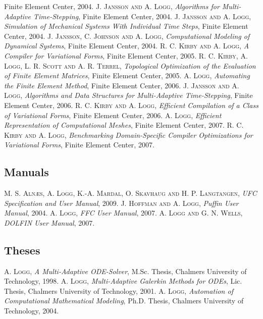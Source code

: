 \begin{thebibliography}{99}
{Finite Element Center,
2004.
}
 {\textsc{J. Jansson and A. Logg},
\textit{Algorithms for Multi-Adaptive Time-Stepping},
Finite Element Center,
2004.
}
 {\textsc{J. Jansson and A. Logg},
\textit{Simulation of Mechanical Systems With Individual Time Steps},
Finite Element Center,
2004.
}
 {\textsc{J. Jansson, C. Johnson and A. Logg},
\textit{Computational Modeling of Dynamical Systems},
Finite Element Center,
2004.
}
 {\textsc{R. C. Kirby and A. Logg},
\textit{A Compiler for Variational Forms},
Finite Element Center,
2005.
}
 {\textsc{R. C. Kirby, A. Logg, L. R. Scott and A. R. Terrel},
\textit{Topological Optimization of the Evaluation of Finite Element Matrices},
Finite Element Center,
2005.
}
 {\textsc{A. Logg},
\textit{Automating the Finite Element Method},
Finite Element Center,
2006.
}
 {\textsc{J. Jansson and A. Logg},
\textit{Algorithms and Data Structures for Multi-Adaptive Time-Stepping},
Finite Element Center,
2006.
}
 {\textsc{R. C. Kirby and A. Logg},
\textit{Efficient Compilation of a Class of Variational Forms},
Finite Element Center,
2006.
}
 {\textsc{A. Logg},
\textit{Efficient Representation of Computational Meshes},
Finite Element Center,
2007.
}
 {\textsc{R. C. Kirby and A. Logg},
\textit{Benchmarking Domain-Specific Compiler Optimizations for Variational Forms},
Finite Element Center,
2007.
}
\subsection*{Manuals}
 {\textsc{M. S. Aln{\ae}s, A. Logg, K.-A. Mardal, O. Skavhaug and H. P. Langtangen},
\textit{{UFC} Specification and User Manual},
2009.
}
 {\textsc{J. Hoffman and A. Logg},
\textit{Puffin User Manual},
2004.
}
 {\textsc{A. Logg},
\textit{{FFC} User Manual},
2007.
}
 {\textsc{A. Logg and G. N. Wells},
\textit{DOLFIN User Manual},
2007.
}
\subsection*{Theses}
 {\textsc{A. Logg},
\textit{A Multi-Adaptive {ODE}-Solver},
M.Sc. Thesis,
Chalmers University of Technology,
1998.
}
 {\textsc{A. Logg},
\textit{Multi-Adaptive {G}alerkin Methods for {ODE}s},
Lic. Thesis,
Chalmers University of Technology,
2001.
}
 {\textsc{A. Logg},
\textit{Automation of Computational Mathematical Modeling},
Ph.D. Thesis,
Chalmers University of Technology,
2004.
}

\end{thebibliography}
